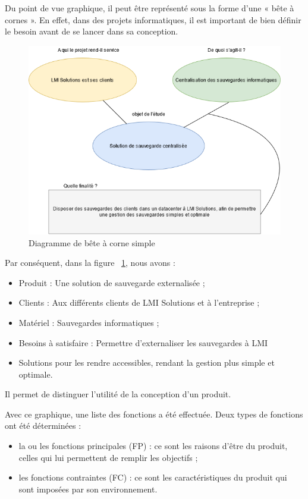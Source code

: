 \documentclass[pfe]{tnreport} %
\begin{document}
Du point de vue graphique, il peut être représenté sous la forme d'une « bête à cornes ». En effet, dans des projets informatiques, il est important de bien définir le besoin avant de se lancer dans sa conception. 
\begin{figure}[!h]
 \centering
 \includegraphics[width=15cm]{figures/bull(1).png}
 \caption{Diagramme de bête à corne simple}
 \label{fig:beteacorne}
\end{figure}
\newpage
Par conséquent, dans la figure ~\ref{fig:beteacorne}, nous avons : \newline
\begin{itemize}
 \item Produit : Une solution de sauvegarde externalisée ;
 \item Clients : Aux différents clients de LMI Solutions et à l'entreprise ;
 \item Matériel : Sauvegardes informatiques ;
 \item Besoins à satisfaire : Permettre d'externaliser les sauvegardes à LMI \item Solutions pour les rendre accessibles, rendant la gestion plus simple et optimale. \newline
\end{itemize}

Il permet de distinguer l'utilité de la conception d'un produit.

Avec ce graphique, une liste des fonctions a été effectuée. Deux types de fonctions ont été déterminées : \newline
\begin{itemize}
 \item la ou les fonctions principales (FP) : ce sont les raisons d'être du produit, celles qui lui permettent de remplir les objectifs ;
 \item les fonctions contraintes (FC) : ce sont les caractéristiques du produit qui sont imposées par son environnement. \newline
\end{itemize}
\end{document}
